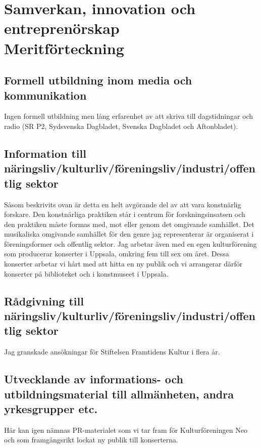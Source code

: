 
\section*{\textsf{Samverkan, innovation och entreprenörskap\\Meritförteckning}}


\subsection*{\textsf{Formell utbildning inom media och kommunikation}}

Ingen formell utbildning men lång erfarenhet av att skriva till dagstidningar och radio (SR P2, Sydsvenska Dagbladet, Svenska Dagbladet och Aftonbladet).

\subsection*{\textsf{Information till näringsliv/kulturliv/föreningsliv/industri/offentlig sektor}}

Såsom beskrivits ovan är detta en helt avgörande del av att vara konstnärlig forskare. Den konstnärliga praktiken står i centrum för forskningsinsatsen och den praktiken måste formas med, mot eller genom det omgivande samhället. Det musikaliska omgivande samhället för den genre jag representerar är organiserat i föreningsformer och offentlig sektor. Jag arbetar även med en egen kulturförening som producerar konserter i Uppsala, omkring fem till sex om året. Dessa konserter arbetar vi hårt med att hitta en ny publik och vi arrangerar därför konserter på biblioteket och i konstmuseet i Uppsala.

\subsection*{\textsf{Rådgivning till näringsliv/kulturliv/föreningsliv/industri/offentlig sektor}}

Jag granskade ansökningar för Stiftelsen Framtidens Kultur i flera år.

\subsection*{\textsf{Utvecklande av informations- och utbildningsmaterial till allmänheten, andra yrkesgrupper etc.}}

Här kan igen nämnas PR-materialet som vi tar fram för Kulturföreningen Neo och som framgångsrikt lockat ny publik till konserterna.

